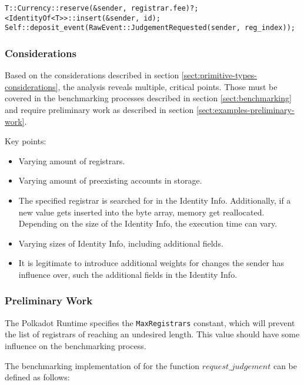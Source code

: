 \documentclass[11pt,a4paper]{article}
\begin{document}
\begin{verbatim}
T::Currency::reserve(&sender, registrar.fee)?;
<IdentityOf<T>>::insert(&sender, id);
Self::deposit_event(RawEvent::JudgementRequested(sender, reg_index));
\end{verbatim}

\subsubsection*{Considerations}

Based on the considerations described in section
\ref{sect:primitive-types-considerations}, the analysis reveals multiple,
critical points. Those must be covered in the benchmarking processes described
in section \ref{sect:benchmarking} and require preliminary work as described in
section \ref{sect:examples-preliminary-work}.
\newline

Key points:
\begin{itemize}
  \item Varying amount of registrars.
  \item Varying amount of preexisting accounts in storage.
  \item The specified registrar is searched for in the Identity Info.
  Additionally, if a new value gets inserted into the byte array, memory get
  reallocated. Depending on the size of the Identity Info, the execution time
  can vary.
  \item Varying sizes of Identity Info, including additional fields.
  \item It is legitimate to introduce additional weights for changes the sender
  has influence over, such the additional fields in the Identity Info.
\end{itemize}

\subsubsection{Preliminary Work}

The Polkadot Runtime specifies the \verb|MaxRegistrars| constant, which will
prevent the list of registrars of reaching an undesired length. This value
should have some influence on the benchmarking process.
\newline

The benchmarking implementation of for the function $request\_judgement$ can be
defined as follows:
\end{document}
